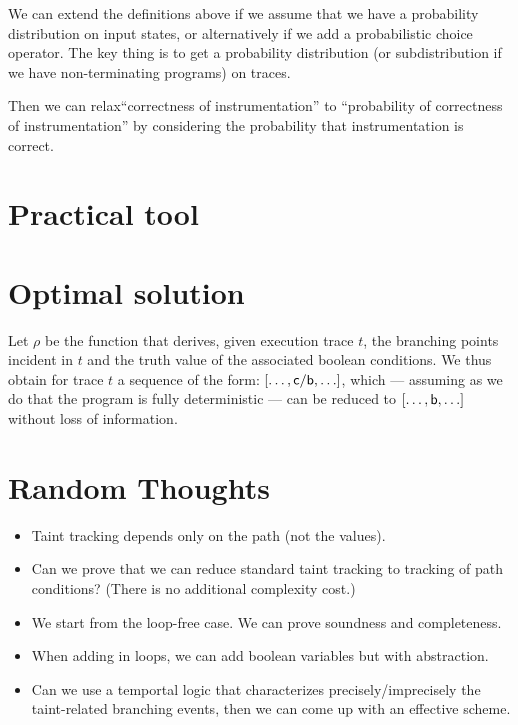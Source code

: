 \documentclass[]{article}
\begin{document}
{We can extend the definitions above if we assume that we have a
probability distribution on input states, or alternatively if we add a
probabilistic choice operator. The key thing is to get a probability
distribution (or subdistribution if we have non-terminating programs)
on traces.

Then we can relax``correctness of instrumentation'' to ``probability of correctness of
instrumentation'' by considering the probability that instrumentation
is correct. 

\section{Practical tool}

\section{Optimal solution}

Let $\rho$ be the function that derives, given execution trace $t$, the branching points incident in $t$ and the truth value of the associated boolean conditions. We thus obtain for trace $t$ a sequence of the form: $[ \ldots , {\sf c}/{\sf b}, \ldots ]$, which --- assuming as we do that the program is fully deterministic --- can be reduced to $[ \ldots, {\sf b}, \ldots]$ without loss of information.

\section{Random Thoughts}

\begin{itemize}
	\item Taint tracking depends only on the path (not the values).
	\item Can we prove that we can reduce standard taint tracking to tracking of path conditions? (There is no additional complexity cost.)
	\item We start from the loop-free case. We can prove soundness and completeness.
	\item When adding in loops, we can add boolean variables but with abstraction.
	\item Can we use a temportal logic that characterizes precisely/imprecisely the taint-related branching events, then we can come up with an effective scheme.
\end{itemize}
}
\end{document}
